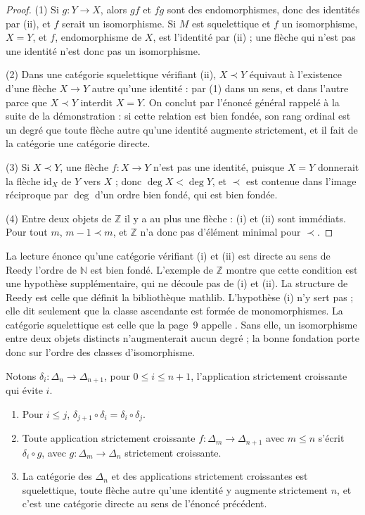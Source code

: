 \begin{proof}
(1) Si $g : Y \to X$, alors $gf$ et $fg$ sont des endomorphismes, donc des identités par (ii), et $f$ serait un isomorphisme. Si $M$ est squelettique et $f$ un isomorphisme, $X = Y$, et $f$, endomorphisme de $X$, est l'identité par (ii) ; une flèche qui n'est pas une identité n'est donc pas un isomorphisme.

(2) Dans une catégorie squelettique vérifiant (ii), $X \prec Y$ équivaut à l'existence d'une flèche $X \to Y$ autre qu'une identité : par (1) dans un sens, et dans l'autre parce que $X \prec Y$ interdit $X = Y$. On conclut par l'énoncé général rappelé à la suite de la démonstration : si cette relation est bien fondée, son rang ordinal est un degré que toute flèche autre qu'une identité augmente strictement, et il fait de la catégorie une catégorie directe.

(3) Si $X \prec Y$, une flèche $f : X \to Y$ n'est pas une identité, puisque $X = Y$ donnerait la flèche $\mathrm{id}_X$ de $Y$ vers $X$ ; donc $\deg X < \deg Y$, et $\prec$ est contenue dans l'image réciproque par $\deg$ d'un ordre bien fondé, qui est bien fondée.

(4) Entre deux objets de $\mathbb Z$ il y a au plus une flèche : (i) et (ii) sont immédiats. Pour tout $m$, $m - 1 \prec m$, et $\mathbb Z$ n'a donc pas d'élément minimal pour $\prec$.
\end{proof}

\begin{remarque}
La lecture énonce qu'une catégorie vérifiant (i) et (ii) est directe au sens de Reedy  l'ordre de $\mathbb N$ est bien fondé. L'exemple de $\mathbb Z$ montre que cette condition est une hypothèse supplémentaire, qui ne découle pas de (i) et (ii). La structure de Reedy est celle que définit la bibliothèque mathlib. L'hypothèse (i) n'y sert pas ; elle dit seulement que la classe ascendante est formée de monomorphismes. La catégorie squelettique est celle que la page~9 appelle . Sans elle, un isomorphisme entre deux objets distincts n'augmenterait aucun degré ; la bonne fondation porte donc sur l'ordre des classes d'isomorphisme.
\end{remarque}

\begin{enonce}
Notons $\delta_i : \Delta_n \to \Delta_{n+1}$, pour $0 \leq i \leq n + 1$, l'application strictement croissante qui évite $i$.
\begin{enumerate}
\item Pour $i \leq j$, $\delta_{j+1} \circ \delta_i = \delta_i \circ \delta_j$.
\item Toute application strictement croissante $f : \Delta_m \to \Delta_{n+1}$ avec $m \leq n$ s'écrit $\delta_i \circ g$, avec $g : \Delta_m \to \Delta_n$ strictement croissante.
\item La catégorie des $\Delta_n$ et des applications strictement croissantes est squelettique, toute flèche autre qu'une identité y augmente strictement $n$, et c'est une catégorie directe au sens de l'énoncé précédent.
\end{enumerate}
\end{enonce}

